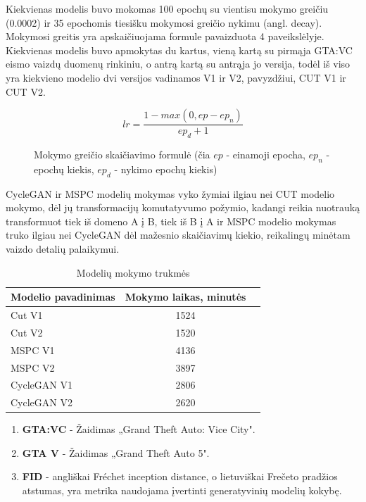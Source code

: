 \documentclass{VUMIFPSkursinis}
\begin{document}
            Kiekvienas modelis buvo mokomas 100 epochų su vientisu mokymo greičiu (0.0002) ir 35 epochomis tiesišku mokymosi greičio nykimu (angl. decay). Mokymosi greitis yra apskaičiuojama formule pavaizduota 4 paveikslėlyje. Kiekvienas modelis buvo apmokytas du kartus, vieną kartą su pirmąja GTA:VC eismo vaizdų duomenų rinkiniu, o antrą kartą su antrąja jo versija, todėl iš viso yra kiekvieno modelio dvi versijos vadinamos V1 ir V2, pavyzdžiui, CUT V1 ir CUT V2.
            \begin{figure}[H]
                \centering
                \[ lr = \frac{1 - max(0, ep - ep_n)}{ep_d + 1} \]
                \captionsetup{width=.6\linewidth}
                \caption{Mokymo greičio skaičiavimo formulė (čia $ep$ - einamoji epocha, 
                $ep_{n}$ - epochų kiekis, $ep_{d}$ - nykimo epochų kiekis)}
            \end{figure}

            CycleGAN ir MSPC modelių mokymas vyko žymiai ilgiau nei CUT modelio mokymo, dėl jų transformacijų komutatyvumo požymio, kadangi reikia nuotrauką transformuot tiek iš domeno A į B, tiek iš B į A ir MSPC modelio mokymas truko ilgiau nei CycleGAN dėl mažesnio skaičiavimų kiekio, reikalingų minėtam vaizdo detalių palaikymui.
            \begin{table}[H]\footnotesize
              \centering
              \caption{Modelių mokymo trukmės}
              {\begin{tabular}{|l|c|c|} \hline
                Modelio pavadinimas & Mokymo laikas, minutės\\
                \hline
                Cut V1 & 1524 \\
                Cut V2 & 1520 \\ 
                MSPC V1 & 4136 \\
                MSPC V2 & 3897 \\
                CycleGAN V1 & 2806 \\
                CycleGAN V2 & 2620 \\
                \hline
              \end{tabular}}
              \label{tab:table example}
            \end{table}

            


\begin{enumerate}
\item \textbf{GTA:VC} - Žaidimas „Grand Theft Auto: Vice City".
\item \textbf{GTA V} - Žaidimas „Grand Theft Auto 5".
\item \textbf{FID} - angliškai Fréchet inception distance, o lietuviškai Frečeto pradžios atstumas, yra metrika naudojama įvertinti generatyvinių modelių kokybę.
\end{enumerate}

\printbibliography[heading=bibintoc]
\end{document}
